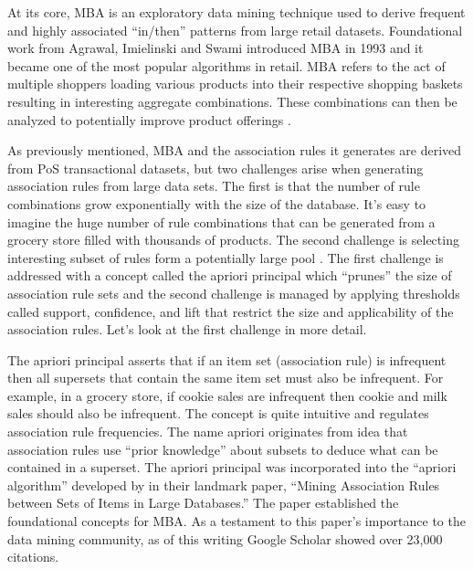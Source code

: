 \documentclass[../article.tex, 12pt]{subfiles}
\begin{document}
\begin{multicols*}{2}
At its core, MBA is an exploratory data mining technique used to derive frequent and highly associated ``in/then'' patterns from large retail datasets. Foundational work from Agrawal, Imielinski and Swami introduced MBA in 1993 and it became one of the most popular algorithms in retail. MBA refers to the act of multiple shoppers loading various products into their respective shopping baskets resulting in interesting aggregate combinations. These combinations can then be analyzed to potentially improve product offerings \citep{avcilar2014association}.

\par
As previously mentioned, MBA and the association rules it generates are derived from PoS transactional datasets, but two challenges arise when generating association rules from large data sets. The first is that the number of rule combinations grow exponentially with the size of the database. It's easy to imagine the huge number of rule combinations that can be generated from a grocery store filled with thousands of products. The second challenge is selecting interesting subset of rules form a potentially large pool \citep{hipp2000algorithms}. The first challenge is addressed with a concept called the apriori principal which ``prunes'' the size of association rule sets and the second challenge is managed by applying thresholds called support, confidence, and lift that restrict the size and applicability of the association rules. Let's look at the first challenge in more detail.

\par
The apriori principal asserts that if an item set (association rule) is infrequent then all supersets that contain the same item set must also be infrequent. For example, in a grocery store, if cookie sales are infrequent then cookie and milk sales should also be infrequent. The concept is quite intuitive and regulates association rule frequencies. The name apriori originates from idea that association rules use ``prior knowledge'' about subsets to deduce what can be contained in a superset. The apriori principal was incorporated into the ``apriori algorithm'' developed by \cite{agrawal1993mining} in their landmark paper, ``Mining Association Rules between Sets of Items in Large Databases.'' The paper established the foundational concepts for MBA. As a testament to this paper's importance to the data mining community, as of this writing Google Scholar showed over 23,000 citations.


\end{multicols*}
\end{document}
